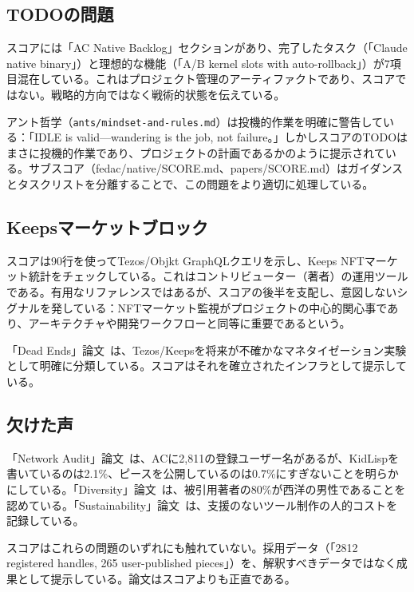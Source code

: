\documentclass[10pt,letterpaper,twocolumn]{article}
\begin{document}
\subsection{TODOの問題}

スコアには「AC Native Backlog」セクションがあり、完了したタスク（「Claude native binary」）と理想的な機能（「A/B kernel slots with auto-rollback」）が7項目混在している。これはプロジェクト管理のアーティファクトであり、スコアではない。戦略的方向ではなく戦術的状態を伝えている。

アント哲学（\texttt{ants/mindset-and-rules.md}）は投機的作業を明確に警告している：「IDLE is valid---wandering is the job, not failure。」しかしスコアのTODOはまさに投機的作業であり、プロジェクトの計画であるかのように提示されている。サブスコア（fedac/native/SCORE.md、papers/SCORE.md）はガイダンスとタスクリストを分離することで、この問題をより適切に処理している。

\subsection{Keepsマーケットブロック}

スコアは90行を使ってTezos/Objkt GraphQLクエリを示し、Keeps NFTマーケット統計をチェックしている。これはコントリビューター（著者）の運用ツールである。有用なリファレンスではあるが、スコアの後半を支配し、意図しないシグナルを発している：NFTマーケット監視がプロジェクトの中心的関心事であり、アーキテクチャや開発ワークフローと同等に重要であるという。

「Dead Ends」論文~\citep{scudder2026deadends}は、Tezos/Keepsを将来が不確かなマネタイゼーション実験として明確に分類している。スコアはそれを確立されたインフラとして提示している。

\subsection{欠けた声}

「Network Audit」論文~\citep{scudder2026audit}は、ACに2,811の登録ユーザー名があるが、KidLispを書いているのは2.1\%、ピースを公開しているのは0.7\%にすぎないことを明らかにしている。「Diversity」論文~\citep{scudder2026diversity}は、被引用著者の80\%が西洋の男性であることを認めている。「Sustainability」論文~\citep{scudder2026sustainability}は、支援のないツール制作の人的コストを記録している。

スコアはこれらの問題のいずれにも触れていない。採用データ（「2812 registered handles, 265 user-published pieces」）を、解釈すべきデータではなく成果として提示している。論文はスコアよりも正直である。
\end{document}

